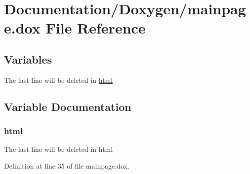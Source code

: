 \hypertarget{mainpage_8dox}{}\section{Documentation/\+Doxygen/mainpage.dox File Reference}
\label{mainpage_8dox}
\subsection*{Variables}
\begin{DoxyCompactItemize}
\item 
The last line will be deleted in \hyperlink{mainpage_8dox_aaf86f0bda38d4b6b25c425bac952ff9d}{html}
\end{DoxyCompactItemize}


\subsection{Variable Documentation}
\mbox{\label{mainpage_8dox_aaf86f0bda38d4b6b25c425bac952ff9d}} 
\subsubsection{\texorpdfstring{html}{html}}
{\footnotesize\ttfamily The last line will be deleted in html}



Definition at line 35 of file mainpage.\+dox.

